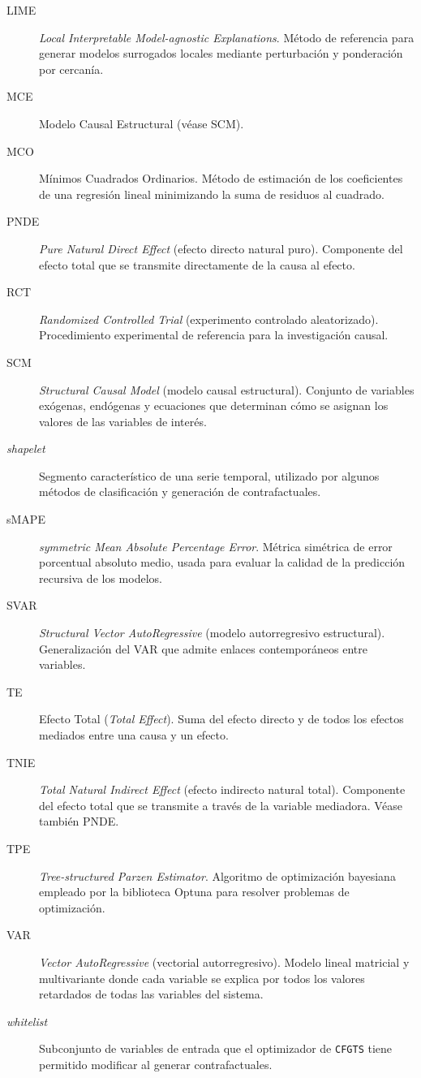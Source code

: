 \documentclass[12pt]{report} %
\begin{document}
\begin{description}
    \item[LIME] \textit{Local Interpretable Model-agnostic Explanations}. Método de referencia para generar modelos surrogados locales mediante perturbación y ponderación por cercanía.
    \item[MCE] Modelo Causal Estructural (véase SCM).
    \item[MCO] Mínimos Cuadrados Ordinarios. Método de estimación de los coeficientes de una regresión lineal minimizando la suma de residuos al cuadrado.
    \item[PNDE] \textit{Pure Natural Direct Effect} (efecto directo natural puro). Componente del efecto total que se transmite directamente de la causa al efecto.
    \item[RCT] \textit{Randomized Controlled Trial} (experimento controlado aleatorizado). Procedimiento experimental de referencia para la investigación causal.
    \item[SCM] \textit{Structural Causal Model} (modelo causal estructural). Conjunto de variables exógenas, endógenas y ecuaciones que determinan cómo se asignan los valores de las variables de interés.
    \item[\textit{shapelet}] Segmento característico de una serie temporal, utilizado por algunos métodos de clasificación y generación de contrafactuales.
    \item[sMAPE] \textit{symmetric Mean Absolute Percentage Error}. Métrica simétrica de error porcentual absoluto medio, usada para evaluar la calidad de la predicción recursiva de los modelos.
    \item[SVAR] \textit{Structural Vector AutoRegressive} (modelo autorregresivo estructural). Generalización del VAR que admite enlaces contemporáneos entre variables.
    \item[TE] Efecto Total (\textit{Total Effect}). Suma del efecto directo y de todos los efectos mediados entre una causa y un efecto.
    \item[TNIE] \textit{Total Natural Indirect Effect} (efecto indirecto natural total). Componente del efecto total que se transmite a través de la variable mediadora. Véase también PNDE.
    \item[TPE] \textit{Tree-structured Parzen Estimator}. Algoritmo de optimización bayesiana empleado por la biblioteca Optuna para resolver problemas de optimización.
    \item[VAR] \textit{Vector AutoRegressive} (vectorial autorregresivo). Modelo lineal matricial y multivariante donde cada variable se explica por todos los valores retardados de todas las variables del sistema.
    \item[\textit{whitelist}] Subconjunto de variables de entrada que el optimizador de \texttt{CFGTS} tiene permitido modificar al generar contrafactuales.
\end{description}
\end{document}
